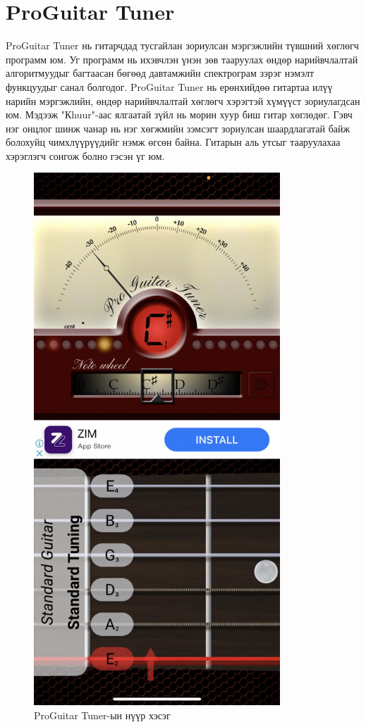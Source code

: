 \section{ProGuitar Tuner}
ProGuitar Tuner нь гитарчдад тусгайлан зориулсан мэргэжлийн түвшний хөглөгч программ юм. Уг программ нь ихэвчлэн үнэн зөв тааруулах өндөр нарийвчлалтай алгоритмуудыг багтаасан бөгөөд давтамжийн спектрограм зэрэг нэмэлт функцуудыг санал болгодог. ProGuitar Tuner нь ерөнхийдөө гитартаа илүү нарийн мэргэжлийн, өндөр нарийвчлалтай хөглөгч хэрэгтэй хүмүүст зориулагдсан юм. Мэдээж "Кhuur"-аас ялгаатай зүйл нь морин хуур биш гитар хөглөдөг. Гэвч нэг онцлог шинж чанар нь нэг хөгжмийн зэмсэгт зориулсан шаардлагатай байж болохуйц чимхлүүрүүдийг нэмж өгсөн байна. Гитарын аль утсыг тааруулахаа хэрэглэгч сонгож болно гэсэн үг юм.
\clearpage
\begin{figure}[h]
	\centering
	\includegraphics[height=20cm]{images/proguitartuner.jpg}
	\caption{ProGuitar Tuner-ын нүүр хэсэг}
	\label{fig:modalform}
\end{figure}
\clearpage
